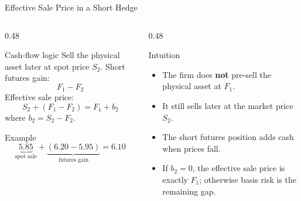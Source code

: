 \documentclass[aspectratio=169,11pt]{beamer}
\begin{document}
\begin{frame}{Effective Sale Price in a Short Hedge}
    \small
    \begin{columns}[T]
        \begin{column}{0.48\textwidth}
            \begin{block}{Cash-flow logic}
                Sell the physical asset later at spot price \(S_2\).
                Short futures gain:
                \[
                    F_1-F_2
                \]
                Effective sale price:
                \[
                    S_2+(F_1-F_2)=F_1+b_2
                \]
                where \(b_2=S_2-F_2\).
            \end{block}

            \begin{exampleblock}{Example}
                \[
                    \underbrace{5.85}_{\text{spot sale}}
                    +
                    \underbrace{(6.20-5.95)}_{\text{futures gain}}
                    =
                    6.10
                \]
            \end{exampleblock}
        \end{column}
        \begin{column}{0.48\textwidth}
            \begin{alertblock}{Intuition}
                \begin{itemize}
                    \item The firm does \textbf{not} pre-sell the physical asset at \(F_1\).
                    \item It still sells later at the market price \(S_2\).
                    \item The short futures position adds cash when prices fall.
                    \item If \(b_2=0\), the effective sale price is exactly \(F_1\); otherwise basis risk is the remaining gap.
                \end{itemize}
            \end{alertblock}
        \end{column}
    \end{columns}
\end{frame}
\end{document}
